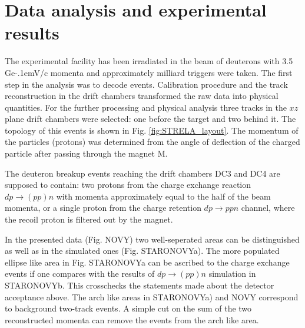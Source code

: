 \documentclass[twocolumn,epjc3]{svjour3}
\newcommand{\dpfrag} {\ensuremath{dp \rightarrow ppn}\xspace}
\newcommand{\dpchex} {\ensuremath{dp \rightarrow (pp)n}\xspace}
\newcommand{\GeVc}   {Ge\kern-.1emV/c\xspace}
\begin{document}

\section{Data analysis and experimental results}
The experimental facility has been irradiated in the beam of deuterons with 3.5
\GeVc momenta and approximately milliard triggers were taken. The first step in
the analysis was to decode events. Calibration procedure and the track
reconstruction in the drift chambers transformed the raw data into physical
quantities. For the further processing and physical analysis three tracks in the
$xz$ plane drift chambers were selected: one before the target and two behind
it. The topology of this events is shown in Fig. \ref{fig:STRELA_layout}. The
momentum of the particles (protons) was determined from the angle of deflection
of the charged particle after passing through the magnet M.

The deuteron breakup events reaching the drift chambers DC3 and DC4 are supposed
to contain: two protons from the charge exchange reaction \dpchex with momenta
approximately equal to the half of the beam momenta, or a single proton from the
charge retention \dpfrag channel, where the recoil proton is filtered out by the
magnet.

In the presented data (Fig. NOVY) two well-seperated areas can be distinguished
as well as in the simulated ones (Fig. STARONOVYa). The more populated ellipse
like area in Fig. STARONOVYa can be ascribed to the charge exchange events if
one compares with the results of \dpchex simulation in STARONOVYb. This
crosschecks the statements made about the detector acceptance above. The arch
like areas in STARONOVYa) and NOVY correspond to background two-track events. A
simple cut on the sum of the two reconstructed momenta can remove the events
from the arch like area.
\end{document}
